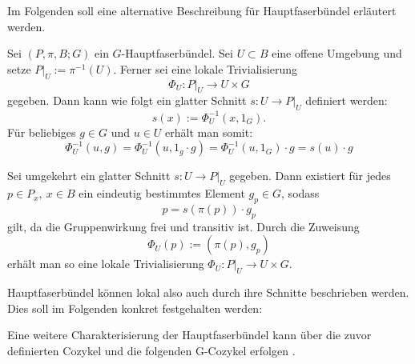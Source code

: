 
Im Folgenden soll eine alternative Beschreibung für Hauptfaserbündel erläutert werden.

Sei $(P, \pi, B ; G)$ ein $G$-Hauptfaserbündel. Sei $U \subset B$ eine offene Umgebung und setze $P|_U := \pi^{-1}(U)$. Ferner sei eine lokale Trivialisierung \[\Phi_U \colon P|_U \to U \times G\] 
gegeben.
Dann kann wie folgt ein glatter Schnitt $s \colon U \to P|_U$ definiert werden: \[s(x) := \Phi_U^{-1}(x,1_G).\]
Für beliebiges $g \in G$ und $u \in U$ erhält man somit: \[\Phi_U^{-1}(u,g) = \Phi_U^{-1}(u,1_g \cdot g) = \Phi_U^{-1}(u,1_G) \cdot g = s(u) \cdot g\]

Sei umgekehrt ein glatter Schnitt $s \colon U \to P|_U$ gegeben. Dann existiert für jedes $p \in P_x, \ x \in B$ ein eindeutig bestimmtes Element $g_p \in G$, sodass \[p = s(\pi(p)) \cdot g_p\] gilt,
da die Gruppenwirkung frei und transitiv ist.
Durch die Zuweisung \[\Phi_U(p) := (\pi(p), g_p)\] erhält man so eine lokale Trivialisierung $\Phi_U \colon P|_U \to U \times G$.


Hauptfaserbündel können lokal also auch durch ihre Schnitte beschrieben werden. Dies soll im Folgenden konkret festgehalten werden:


Eine weitere Charakterisierung der Hauptfaserbündel kann über die zuvor definierten Cozykel und die folgenden G-Cozykel erfolgen \cite{baum}.


